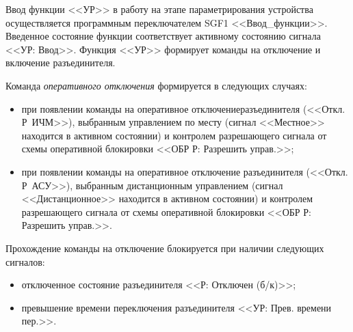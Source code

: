 
\begin{flushleft}
\color{black}
\nopagebreak
\end{flushleft}

\par
Ввод функции <<УР>> в работу на этапе параметрирования устройства осуществляется программным переключателем SGF1 <<Ввод\_функции>>. Введенное состояние функции соответствует активному состоянию сигнала <<УР: Ввод>>.
Функция <<УР>> формирует команды на отключение и включение разъединителя.

\par
Команда \emph{оперативного отключения} формируется в следующих случаях:
\begin{itemize}
	\item при появлении команды на оперативное отключениеразъединителя (<<Откл. Р~ИЧМ>>), выбранным управлением по месту (сигнал <<Местное>> находится в активном состоянии) и контролем разрешающего сигнала от схемы оперативной блокировки <<ОБР Р: Разрешить управ.>>;
	\item при появлении команды на оперативное отключение разъединителя (<<Откл. Р~АСУ>>), выбранным дистанционным управлением (сигнал <<Дистанционное>> находится в активном состоянии) и контролем разрешающего сигнала от схемы оперативной блокировки <<ОБР Р: Разрешить управ.>>.
\end{itemize}
Прохождение команды на отключение блокируется при наличии следующих сигналов:
\begin{itemize}
	\item отключенное состояние разъединителя <<Р: Отключен (б/к)>>;
	\item превышение времени переключения разъединителя <<УР: Прев. времени пер.>>.
\end{itemize}

